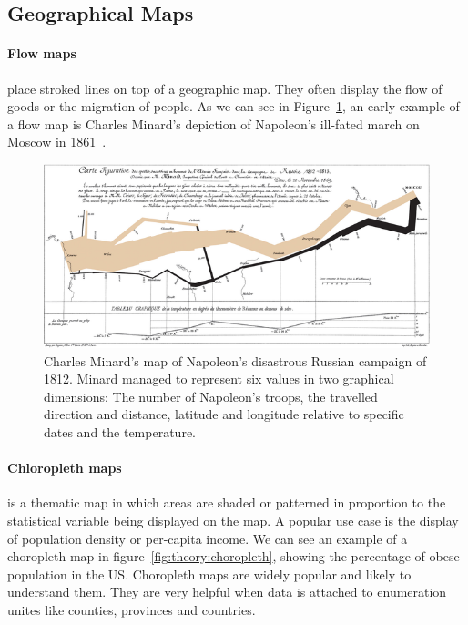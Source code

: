 \documentclass{article}
\begin{document}
\subsection{Geographical Maps}
\paragraph{Flow maps} place stroked lines on top of a geographic map.
They often display the flow of goods or the migration of people.
As we can see in Figure~\ref{fig:theory:flow-map}, an early example of a flow map is Charles Minard’s depiction of Napoleon’s ill-fated march on Moscow in 1861~\cite{Corbett2001}.
\begin{figure}[h]
  \centering
  \includegraphics[width=\textwidth]{images/theory/minard}
  \caption{%
    Charles Minard's map of Napoleon's disastrous Russian campaign of 1812.
    Minard managed to represent six values in two graphical dimensions:
    The number of Napoleon's troops, the travelled direction and distance, latitude and longitude relative to specific dates and the temperature.
  }\label{fig:theory:flow-map}
\end{figure}

\paragraph{Chloropleth maps} is a thematic map in which areas are shaded or patterned in proportion to the statistical variable being displayed on the map.
A popular use case is the display of population density or per-capita income.
We can see an example of a choropleth map in figure~\ref{fig:theory:choropleth}, showing the percentage of obese population in the US\@.
Choropleth maps are widely popular and likely to understand them.
They are very helpful when data is attached to enumeration unites like counties, provinces and countries.
\end{document}
